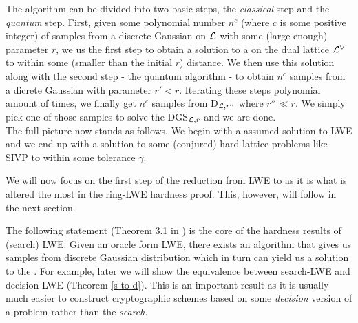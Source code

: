 The algorithm can be divided into two basic steps, the \textit{classical} step and the \textit{quantum} step. First, given some polynomial number $n^c$ (where $c$ is some positive integer) of samples from a discrete Gaussian on $\mathcal{L}$ with some (large enough) parameter $r$, we us the first step to obtain a solution to a  on the dual lattice $\mathcal{L}^{\vee}$ to within some (smaller than the initial $r$) distance. We then use this solution along with the second step - the quantum algorithm - to obtain $n^c$ samples from a dicrete Gaussian with parameter $r' < r$. Iterating these steps polynomial amount of times, we finally get $n^c$ samples from D$_{\mathcal{L}, r''}$ where $r'' \ll r$. We simply pick one of those samples to solve the DGS$_{\mathcal{L}, r}$ and we are done.
\\
The full picture now stands as follows. We begin with a assumed solution to LWE and we end up with a solution to some (conjured) hard lattice problems like SIVP to within some tolerance $\gamma$.
\begin{center}
\end{center}
We will now focus on the first step of the reduction from LWE to  as it is what is altered the most in the ring-LWE hardness proof. This, however, will follow in the next section.

The following statement (Theorem 3.1 in \cite{regev}) is the core of the hardness results of (search) LWE. Given an oracle form LWE, there exists an algorithm that gives us samples from discrete Gaussian distribution which in turn can yield us a solution to the . For example, later we will show the equivalence between search-LWE and decision-LWE (Theorem \ref{s-to-d}). This is an important result as it is usually much easier to construct cryptographic schemes based on some \textit{decision} version of a problem rather than the \textit{search}.

